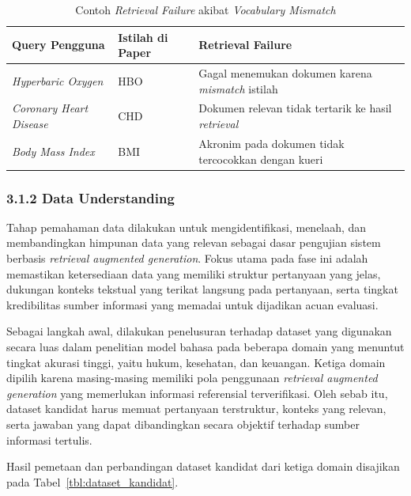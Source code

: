 \begin{table}[H]
\centering
\caption{Contoh \textit{Retrieval Failure} akibat \textit{Vocabulary Mismatch}}
\label{tbl:retrieval-failure}
\begin{tabular}{|p{4cm}|p{2cm}|p{6cm}|}
\hline
\textbf{Query Pengguna} & \textbf{Istilah di Paper} & \textbf{Retrieval Failure} \\ \hline
\textit{Hyperbaric Oxygen} & HBO & Gagal menemukan dokumen karena \textit{mismatch} istilah \\ \hline
\textit{Coronary Heart Disease} & CHD & Dokumen relevan tidak tertarik ke hasil \textit{retrieval} \\ \hline
\textit{Body Mass Index} & BMI & Akronim pada dokumen tidak tercocokkan dengan kueri \\ \hline
\end{tabular}
\end{table}


\subsubsection*{3.1.2 Data Understanding}

Tahap pemahaman data dilakukan untuk mengidentifikasi, menelaah, dan membandingkan himpunan data yang relevan sebagai dasar pengujian sistem berbasis \textit{retrieval augmented generation}. Fokus utama pada fase ini adalah memastikan ketersediaan data yang memiliki struktur pertanyaan yang jelas, dukungan konteks tekstual yang terikat langsung pada pertanyaan, serta tingkat kredibilitas sumber informasi yang memadai untuk dijadikan acuan evaluasi.

Sebagai langkah awal, dilakukan penelusuran terhadap dataset yang digunakan secara luas dalam penelitian model bahasa pada beberapa domain yang menuntut tingkat akurasi tinggi, yaitu hukum, kesehatan, dan keuangan. Ketiga domain dipilih karena masing-masing memiliki pola penggunaan \textit{retrieval augmented generation} yang memerlukan informasi referensial terverifikasi. Oleh sebab itu, dataset kandidat harus memuat pertanyaan terstruktur, konteks yang relevan, serta jawaban yang dapat dibandingkan secara objektif terhadap sumber informasi tertulis.

Hasil pemetaan dan perbandingan dataset kandidat dari ketiga domain disajikan pada Tabel~\ref{tbl:dataset_kandidat}.

